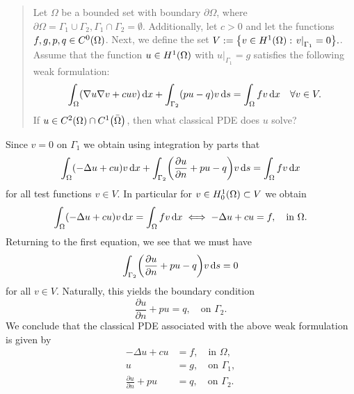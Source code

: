 \documentclass[english]{exercise}
\begin{document}
	\section{}

	\begin{quote}
		Let \(\Omega\) be a bounded set with boundary \(\partial\Omega\), where \(\partial\Omega = \Gamma_1 \cup \Gamma_2, \Gamma_1 \cap \Gamma_2 = \emptyset\).
		Additionally, let \(c > 0\) and let the functions \(f, g, p, q \in C^0\parentheses*{\Omega}\).
		Next, we define the set \(V := \braces*{v \in H^1\parentheses*{\Omega} : \left.v\right|_{\Gamma_1} = 0}.\).
		Assume that the function \(u \in H^1\parentheses*{\Omega}\) with \(\left.u\right|_{\Gamma_1} = g\) satisfies the following weak formulation:
		\[
			\int_\Omega \parentheses*{\nabla u\nabla v + cuv}\d x + \int_{\Gamma_2}\parentheses*{pu - q}v\d s = \int_\Omega fv\d x \quad \forall v \in V.
		\]
		If \(u \in C^2\parentheses*{\Omega} \cap C^1\parentheses*{\bar{\Omega}}\), then what classical PDE does \(u\) solve?
	\end{quote}

	Since \(v = 0\) on \(\Gamma_1\) we obtain using integration by parts that
	\[
		\int_\Omega \parentheses*{-\Delta u + cu}v\d x + \int_{\Gamma_2}\parentheses*{\frac{\partial u}{\partial n} + pu - q}v\d s = \int_\Omega fv\d x
	\]
	for all test functions \(v \in V\).
	In particular for \(v \in H_0^1\parentheses*{\Omega} \subset V\) we obtain
	\[
		\int_\Omega \parentheses*{-\Delta u + cu}v\d x = \int_\Omega fv\d x \iff -\Delta u + cu = f, \quad \text{in }\Omega.
	\]
	Returning to the first equation, we see that we must have
	\[
		\int_{\Gamma_2}\parentheses*{\frac{\partial u}{\partial n} + pu - q}v\d s = 0
	\]
	for all \(v \in V\).
	Naturally, this yields the boundary condition
	\[
		\frac{\partial u}{\partial n} + pu = q, \quad \text{on }\Gamma_2.
	\]
	We conclude that the classical PDE associated with the above weak formulation is given by
	\begin{align*}
		-\Delta u + cu &= f, \quad \text{in }\Omega,\\
		u &= g, \quad \text{on }\Gamma_1,\\
		\frac{\partial u}{\partial n} + pu &= q, \quad \text{on }\Gamma_2.
	\end{align*}


	\section{}
\end{document}
